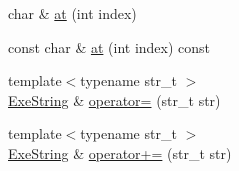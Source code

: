 \begin{DoxyCompactItemize}
\item 
char \& \hyperlink{class_tri_1_1_util_1_1_exe_string_ab2bf90f3b8d3d0a3ae80a7dd3651bd46}{at} (int index)
\item 
const char \& \hyperlink{class_tri_1_1_util_1_1_exe_string_a9b9e2cabdedeeca1ef7a454e28464ac1}{at} (int index) const 
\item 
{\footnotesize template$<$typename str\+\_\+t $>$ }\\\hyperlink{class_tri_1_1_util_1_1_exe_string}{Exe\+String} \& \hyperlink{class_tri_1_1_util_1_1_exe_string_a1f707d19f64ff06043b46c57a512395a}{operator=} (str\+\_\+t str)
\item 
{\footnotesize template$<$typename str\+\_\+t $>$ }\\\hyperlink{class_tri_1_1_util_1_1_exe_string}{Exe\+String} \& \hyperlink{class_tri_1_1_util_1_1_exe_string_ab6c11770595b5a00647123306fa66a0f}{operator+=} (str\+\_\+t str)
\end{DoxyCompactItemize}

